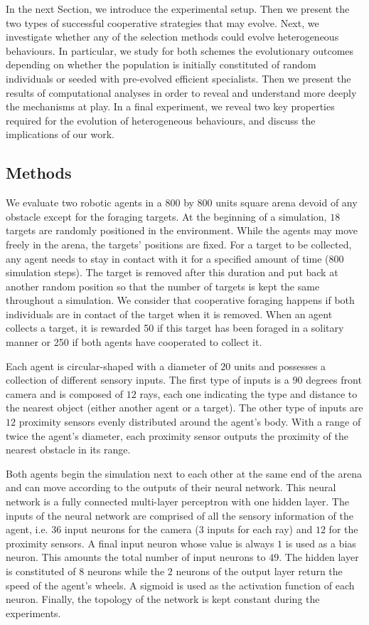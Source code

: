     In the next Section, we introduce the experimental setup. Then we present the two types of successful cooperative strategies that may evolve. Next, we investigate whether any of the selection methods could evolve heterogeneous behaviours. In particular, we study for both schemes the evolutionary outcomes depending on whether the population is initially constituted of random individuals or seeded with pre-evolved efficient specialists. Then we present the results of computational analyses in order to reveal and understand more deeply the mechanisms at play. In a final experiment, we reveal two key properties required for the evolution of heterogeneous behaviours, and discuss the implications of our work.




  \subsection{Methods}
  \label{sec:methods}
    We evaluate two robotic agents in a $800$ by $800$ units square arena devoid of any obstacle except for the foraging targets. At the beginning of a simulation, $18$ targets are randomly positioned in the environment. While the agents may move freely in the arena, the targets' positions are fixed. For a target to be collected, any agent needs to stay in contact with it for a specified amount of time ($800$ simulation steps). The target is removed after this duration and put back at another random position so that the number of targets is kept the same throughout a simulation. We consider that cooperative foraging happens if both individuals are in contact of the target when it is removed. When an agent collects a target, it is rewarded 50 if this target has been foraged in a solitary manner or 250 if both agents have cooperated to collect it.

    Each agent is circular-shaped with a diameter of $20$ units and possesses a collection of different sensory inputs. The first type of inputs is a $90$ degrees front camera and is composed of $12$ rays, each one indicating the type and distance to the nearest object (either another agent or a target). The other type of inputs are $12$ proximity sensors evenly distributed around the agent's body. With a range of twice the agent's diameter, each proximity sensor outputs the proximity of the nearest obstacle in its range.

    Both agents begin the simulation next to each other at the same end of the arena and can move according to the outputs of their neural network. This neural network is a fully connected multi-layer perceptron with one hidden layer. The inputs of the neural network are comprised of all the sensory information of the agent, i.e. $36$ input neurons for the camera ($3$ inputs for each ray) and $12$ for the proximity sensors. A final input neuron whose value is always $1$ is used as a bias neuron. This amounts the total number of input neurons to $49$. The hidden layer is constituted of $8$ neurons while the $2$ neurons of the output layer return the speed of the agent's wheels. A sigmoid is used as the activation function of each neuron. Finally, the topology of the network is kept constant during the experiments.

